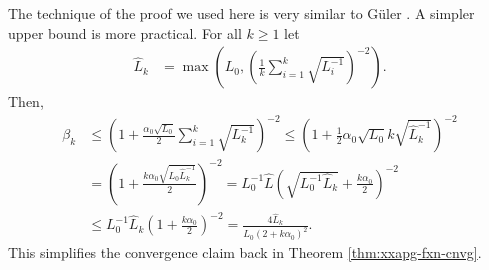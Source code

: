 \documentclass[12pt]{report}
\begin{document}
        \begin{remark}
            The technique of the proof we used here is very similar to Güler \cite[Lemma 2.2]{guler_new_1992}.
            A simpler upper bound is more practical. 
            For all $k \ge 1$ let  
            \begin{align*}
                \widehat L_k &= \max\left(
                    L_0, \left(
                        \frac{1}{k} \sum_{i = 1}^{k} \sqrt{L_i^{-1}}
                    \right)^{-2}
                \right). 
            \end{align*}
            Then, 
            \begin{align*}
                \beta_k 
                &\le \left(
                    1 + 
                    \frac{\alpha_0 \sqrt{L_0}}{2}\sum_{i = 1}^{k}\sqrt{L^{-1}_k}
                \right)^{-2}
                \le \left(
                    1 + \frac{1}{2}\alpha_0 \sqrt{L_0}k\sqrt{\widehat L^{-1}_k}
                \right)^{-2}
                \\
                &= \left(
                    1 + \frac{k\alpha_0\sqrt{L_0 \widehat L^{-1}_k}}{2}
                \right)^{-2} = L^{-1}_0\widehat L\left(
                    \sqrt{L_0^{-1}\widehat L_k} + \frac{k\alpha_0}{2}
                \right)^{-2}
                \\
                &\le 
                L^{-1}_0\widehat L_k\left(
                    1 + \frac{k\alpha_0}{2}
                \right)^{-2} 
                = \frac{4\widehat L_k}{L_0(2 + k \alpha_0)^2}. 
            \end{align*}
            This simplifies the convergence claim back in Theorem \ref{thm:xxapg-fxn-cnvg}. 
        \end{remark}
\end{document}

